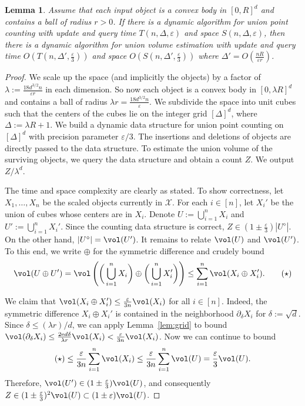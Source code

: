 \documentclass[a4paper, 11pt]{article}
\newtheorem{lemma}[theorem]{Lemma}
\newcommand{\eps}{\varepsilon}
\newcommand{\class}[1]{\mathcal{#1}}
\newcommand{\discrete}[1]{#1^\diamond}
\begin{document}
\begin{lemma}
    \label{lem:discretization}
    Assume that each input object is a convex body in $[0,R]^d$ and contains a ball of radius $r>0$. If there is a dynamic algorithm for union point counting with update and query time $T(n,\Delta,\eps)$ and space $S(n,\Delta,\eps)$, then there is a dynamic algorithm for union volume estimation with update and query time $O(T(n, \Delta', \frac{\eps}{3}))$ and space $O(S(n, \Delta', \frac{\eps}{3}))$ where $\Delta' = O(\frac{n R}{\eps r})$.
\end{lemma}

\begin{proof}
    We scale up the space (and implicitly the objects) by a factor of $\lambda := \frac{18 d^{3/2} n}{\eps r}$ in each dimension. So now each object is a convex body in $[0, \lambda R]^d$ and contains a ball of radius $\lambda r = \frac{18 d^{3/2} n}{\eps}$. We subdivide the space into unit cubes such that the centers of the cubes lie on the integer grid $[\Delta]^d$, where $\Delta := \lambda R + 1$. We build a dynamic data structure for union point counting on $[\Delta]^d$ with precision parameter $\eps/3$. The insertions and deletions of objects are directly passed to the data structure. To estimate the union volume of the surviving objects, we query the data structure and obtain a count $Z$. We output $Z/\lambda^d$.

    The time and space complexity are clearly as stated. To show correctness, let $X_1, \dots, X_n$ be the scaled objects currently in $\class{X}$. For each $i \in [n]$, let $X_i'$ be the union of cubes whose centers are in $X_i$. Denote $U := \bigcup_{i=1}^n X_i$ and $U' := \bigcup_{i=1}^n X_i'$. Since the counting data structure is correct, $Z \in (1\pm\frac{\eps}{3}) |\discrete{U}|$. On the other hand, $|\discrete{U}| = \vol(U')$. It remains to relate $\vol(U)$ and $\vol(U')$. To this end, we write $\oplus$ for the symmetric difference and crudely bound
    \[
        \vol(U \oplus U')
        = \vol \left( \bigg( \bigcup_{i=1}^n X_i \bigg) \oplus \bigg( \bigcup_{i=1}^n X'_i \bigg) \right)
        \leq \sum_{i=1}^n \vol(X_i \oplus X'_i). \tag{$\star$}
    \]

    We claim that $\vol(X_i \oplus X_i') \leq \frac{\eps}{3n} \vol(X_i)$ for all $i \in [n]$. Indeed, the symmetric difference $X_i \oplus X_i'$ is contained in the neighborhood $\partial_\delta X_i$ for $\delta := \sqrt{d}$. Since $\delta \leq (\lambda r)/d$, we can apply Lemma~\ref{lem:grid} to bound $\vol(\partial_\delta X_i) \leq \frac{2 \mathrm{e} d \delta}{\lambda r} \vol(X_i) < \frac{\eps}{3n} \vol(X_i)$. Now we can continue to bound
    \[
        (\star)
        \leq \frac{\eps}{3n} \sum_{i=1}^n \vol(X_i)
        \leq \frac{\eps}{3n} \sum_{i=1}^n \vol(U)
        = \frac{\eps}{3} \vol(U).
    \]
    Therefore, $\vol(U') \in (1 \pm \frac{\eps}{3}) \vol(U)$, and consequently $Z \in (1\pm \frac{\eps}{3})^2 \vol(U) \subset (1\pm\eps) \vol(U)$.
\end{proof}
\end{document}
